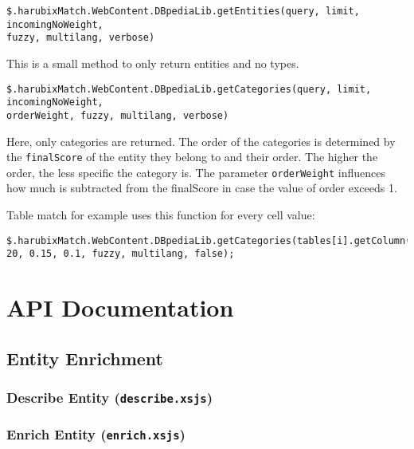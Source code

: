 \scriptsize
\begin{verbatim}
$.harubixMatch.WebContent.DBpediaLib.getEntities(query, limit, incomingNoWeight,
fuzzy, multilang, verbose)
\end{verbatim}
\normalsize

This is a small method to only return entities and no types.

\scriptsize
\begin{verbatim}
$.harubixMatch.WebContent.DBpediaLib.getCategories(query, limit, incomingNoWeight,
orderWeight, fuzzy, multilang, verbose)
\end{verbatim}
\normalsize

Here, only categories are returned. The order of the categories is determined by the \texttt{finalScore} of the entity they belong to and their order. The higher the order, the less specific the category is. The parameter \texttt{orderWeight} influences how much is subtracted from the finalScore in case the value of order exceeds 1.

Table match for example uses this function for every cell value:

\scriptsize
\begin{verbatim}
$.harubixMatch.WebContent.DBpediaLib.getCategories(tables[i].getColumn(j).getCell(k).getValue(),
20, 0.15, 0.1, fuzzy, multilang, false);
\end{verbatim}
\normalsize

\section{API Documentation}

\subsection{Entity Enrichment}

\subsubsection{Describe Entity (\texttt{describe.xsjs})}



\subsubsection{Enrich Entity (\texttt{enrich.xsjs})}

